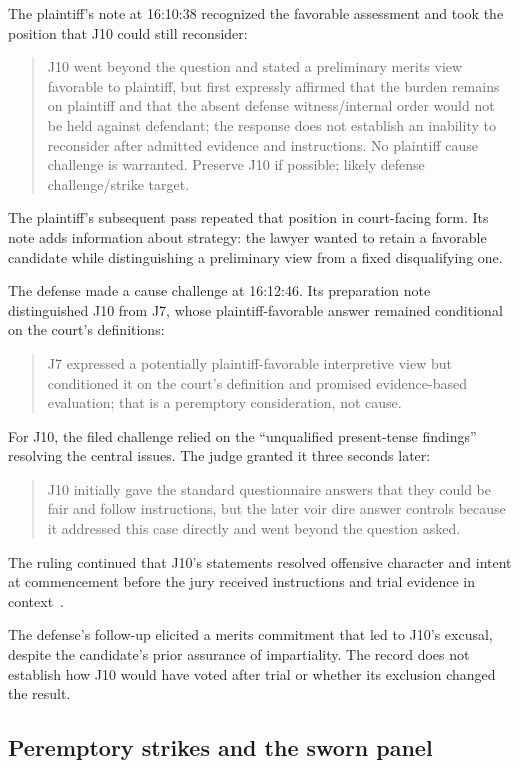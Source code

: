 The plaintiff's note at 16:10:38 recognized the favorable assessment and took the position that J10 could still reconsider:
\begin{quote}
J10 went beyond the question and stated a preliminary merits view favorable to plaintiff, but first expressly affirmed that the burden remains on plaintiff and that the absent defense witness/internal order would not be held against defendant; the response does not establish an inability to reconsider after admitted evidence and instructions.  No plaintiff cause challenge is warranted.  Preserve J10 if possible; likely defense challenge/strike target.
\end{quote}
The plaintiff's subsequent pass repeated that position in court-facing form.  Its note adds information about strategy: the lawyer wanted to retain a favorable candidate while distinguishing a preliminary view from a fixed disqualifying one.

The defense made a cause challenge at 16:12:46.  Its preparation note distinguished J10 from J7, whose plaintiff-favorable answer remained conditional on the court's definitions:
\begin{quote}
J7 expressed a potentially plaintiff-favorable interpretive view but conditioned it on the court's definition and promised evidence-based evaluation; that is a peremptory consideration, not cause.
\end{quote}
For J10, the filed challenge relied on the “unqualified present-tense findings” resolving the central issues.  The judge granted it three seconds later:
\begin{quote}
J10 initially gave the standard questionnaire answers that they could be fair and follow instructions, but the later voir dire answer controls because it addressed this case directly and went beyond the question asked.
\end{quote}
The ruling continued that J10's statements resolved offensive character and intent at commencement before the jury received instructions and trial evidence in context~\cite[events 263, 277--278]{record}.

The defense's follow-up elicited a merits commitment that led to J10's excusal, despite the candidate's prior assurance of impartiality.  The record does not establish how J10 would have voted after trial or whether its exclusion changed the result.

\subsection{Peremptory strikes and the sworn panel}

